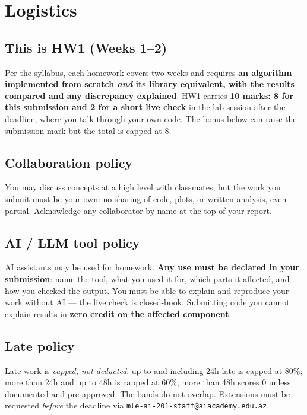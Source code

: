 \documentclass[11pt,a4paper]{article}
\begin{document}
\section{Logistics}\label{sec:logistics}

\subsection{This is HW1 (Weeks 1--2)}
Per the syllabus, each homework covers two weeks and requires \textbf{an algorithm implemented from scratch \emph{and} its library equivalent, with the results compared and any discrepancy explained}. HW1 carries \textbf{10 marks: 8 for this submission and 2 for a short live check} in the lab session after the deadline, where you talk through your own code. The bonus below can raise the submission mark but the total is capped at 8.

\subsection{Collaboration policy}
You may discuss concepts at a high level with classmates, but the work you submit must be your own: no sharing of code, plots, or written analysis, even partial. Acknowledge any collaborator by name at the top of your report.

\subsection{AI / LLM tool policy}
AI assistants may be used for homework. \textbf{Any use must be declared in your submission}: name the tool, what you used it for, which parts it affected, and how you checked the output. You must be able to explain and reproduce your work without AI --- the live check is closed-book. Submitting code you cannot explain results in \textbf{zero credit on the affected component}.

\subsection{Late policy}
Late work is \emph{capped, not deducted}: up to and including 24h late is capped at 80\%; more than 24h and up to 48h is capped at 60\%; more than 48h scores 0 unless documented and pre-approved. The bands do not overlap. Extensions must be requested \emph{before} the deadline via \texttt{mle-ai-201-staff@aiacademy.edu.az}.
\end{document}
